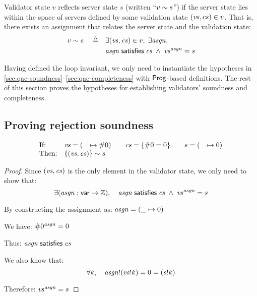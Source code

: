 \begin{definition}
Validator state $v$ reflects server state $s$ (written ``$v\sim s$'') if
the server state lies within the space of servers defined by some validation
state $(\mathit{vs},cs)\in v$.  That is, there exists an assignment that relates the
server state and the validation state:
\begin{align*}
v\sim s\quad\triangleq\quad&\exists(\mathit{vs},\mathit{cs})\in
  v,\;\exists\mathit{asgn},\\
  &\mathit{asgn}\;\mathsf{satisfies}\;\mathit{cs}\;\wedge\;\mathit{vs}^{\mathit{asgn}}=s
  \end{align*}
\end{definition}

Having defined the loop invariant, we only need to instantiate the hypotheses
in \autoref{sec:qac-soundness}--\ref{sec:qac-completeness} with $\mathsf{Prog}$-based
definitions.  The rest of this section proves the hypotheses for establishing
validators' soundness and completeness.

\subsection{Proving rejection soundness}
\label{sec:proof-sound}
\begin{lemma}[\ref{eq:rs1}]
\[\begin{array}{ll}
\text{If:}&
\mathit{vs}=(\_\mapsto\#0)\qquad
\mathit{cs}=\{\#0=0\}\qquad
s=(\_\mapsto0)\\
\text{Then:}&\{(\mathit{vs},\mathit{cs})\}\sim s
\end{array}\]
\end{lemma}
\begin{proof}
Since $(\mathit{vs},\mathit{cs})$ is the only element in the validator state, we only need to show
that:
\[\exists(\mathit{asgn}:\mathsf{var}\to\mathbb Z),\quad\mathit{asgn}\;\mathsf{satisfies}\;\mathit{cs}\;\wedge\;\mathit{vs}^{\mathit{asgn}}=s\]

By constructing the assignment as: \(\mathit{asgn}=(\_\mapsto0)\)

We have: \(\#0^{\mathit{asgn}}=0\)

Thus: \(\mathit{asgn}\;\mathsf{satisfies}\;\mathit{cs}\)

We also know that: \[\forall k, \quad\mathit{asgn}!(\mathit{vs}!k)=0=(s!k)\]

Therefore: \(\mathit{vs}^{\mathit{asgn}}=s\)
\end{proof}

